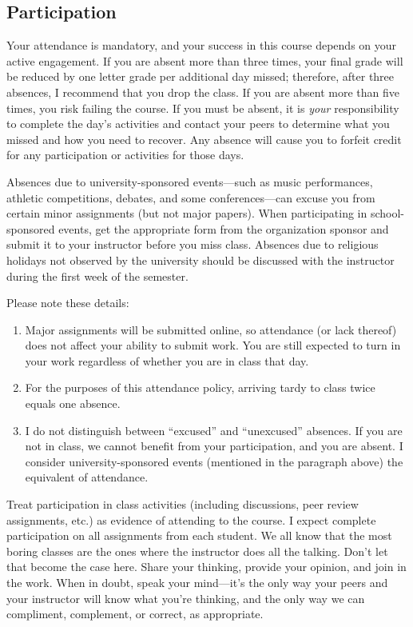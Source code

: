 \documentclass[11pt,oneside]{amsart}	%
\begin{document}
\subsection{Participation}
Your attendance is mandatory, and your success in this course depends on your active engagement.  If you are absent more than three times, your final grade will be reduced by one letter grade per additional day missed; therefore, after three absences, I recommend that you drop the class. If you are absent more than five times, you risk failing the course.  If you must be absent, it is \emph{your} responsibility to complete the day's activities and contact your peers to determine what you missed and how you need to recover. Any absence will cause you to forfeit credit for any participation or activities for those days.

Absences due to university-sponsored events---such as music performances, athletic competitions, debates, and some conferences---can excuse you from certain minor assignments (but not major papers). When participating in school-sponsored events, get the appropriate form from the organization sponsor and submit it to your instructor before you miss class. Absences due to religious holidays not observed by the university should be discussed with the instructor during the first week of the semester.

Please note these details: 
\begin{enumerate}
	\item Major assignments will be submitted online, so attendance (or lack thereof) does not affect your ability to submit work. You are still expected to turn in your work regardless of whether you are in class that day.
	\item For the purposes of this attendance policy, arriving tardy to class twice equals one absence.
	\item I do not distinguish between ``excused'' and ``unexcused'' absences. If you are not in class, we cannot benefit from your participation, and you are absent. I consider university-sponsored events (mentioned in the paragraph above) the equivalent of attendance.
\end{enumerate}

Treat participation in class activities (including discussions, peer review assignments, etc.) as evidence of attending to the course. I expect complete participation on all assignments from each student. We all know that the most boring classes are the ones where the instructor does all the talking. Don't let that become the case here. Share your thinking, provide your opinion, and join in the work. When in doubt, speak your mind---it's the only way your peers and your instructor will know what you're thinking, and the only way we can compliment, complement, or correct, as appropriate.
\end{document}
